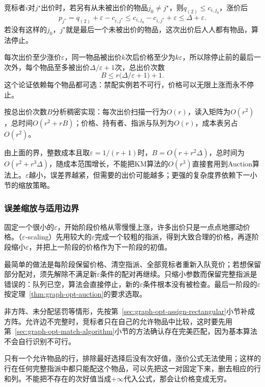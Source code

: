 竞标者$i$对$j^\star$出价时，若另有从未被出价的物品$j_0\neq j^\star$，则$q_{(2)}\leq c_{i,j_0}$，涨价后
\[
  p_{j^\star}=q_{(2)}+\varepsilon-c_{i,j^\star}\leq c_{i,j_0}-c_{i,j^\star}+\varepsilon\leq\Delta+\varepsilon.
\]
若没有这样的$j_0$，$j^\star$就是最后一个未被出价的物品，这次出价后人人都有物品，算法停止。

每次出价至少涨价$\varepsilon$，同一物品被出价$k$次后价格至少为$k\varepsilon$，所以除停止前的最后一次外，每个物品至多被出价$\Delta/\varepsilon+1$次，总出价次数
\begin{equation}
  B\leq r\bigl(\Delta/\varepsilon+1\bigr)+1.
  \label{eq:graph-opt-auction-bids}
\end{equation}
这个论证依赖每个物品都可选：禁配实例若不可行，价格可以无限上涨而永不停止。

按总出价次数$B$分析稠密实现：每次出价扫描一行为$O(r)$，读入矩阵为$O(r^2)$，总时间$O(r^2+rB)$；价格、持有者、指派与队列为$O(r)$，成本表另占$O(r^2)$。

由上面的界，整数成本且取$\varepsilon=1/(r+1)$时，$B=O(r+r^2\Delta)$，总时间为$O(r^2+r^3\Delta)$，随成本范围增长，不能把KM算法的$O(r^3)$直接套用到Auction算法上。$\varepsilon$越小，误差界越紧，但需要的出价可能越多；更强的复杂度界依赖下一小节的缩放策略。

\subsubsection{误差缩放与适用边界}

固定一个很小的$\varepsilon$，开始阶段价格从零慢慢上涨，许多出价只是一点点地挪动价格。（$\varepsilon$-scaling）先用较大的$\varepsilon$完成一个较粗的指派，得到大致合理的价格，再逐阶段缩小$\varepsilon$，并把上一阶段的价格作为下一阶段的初值。

最简单的做法是每阶段保留价格、清空指派、全部竞标者重新入队竞价；若想保留部分配对，须先解除不满足新$\varepsilon$条件的配对再继续。只缩小参数而保留完整指派是错误的：队列已空，算法会直接停止，新的$\varepsilon$条件根本没有被检查。最后一阶段的$\varepsilon$按定理~\ref{thm:graph-opt-auction}的要求选取。

非方阵、未分配惩罚等情形，先按第~\ref{sec:graph-opt-assign-rectangular}小节补成方阵。允许边不完整时，竞标者只在自己的允许物品中比较，这时要先用第~\ref{sec:graph-opt-match-algorithm}小节的方法确认存在完美匹配，因为基本算法不会自行识别不可行。

只有一个允许物品的行，排除最好选择后没有次好值，涨价公式无法使用；这样的行在任何完整指派中都只能配这个物品，可以先把这一对固定下来，删去相应的行和列。不能把不存在的次好值当成$+\infty$代入公式，那会让价格变成无穷。

